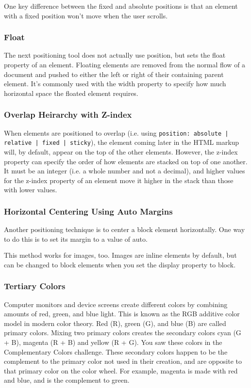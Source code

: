One key difference between the fixed and absolute positions is that an element with a fixed position won't move when the user scrolls.

\subsubsection{Float}
The next positioning tool does not actually use position, but sets the float property of an element. Floating elements are removed from the normal flow of a document and pushed to either the left or right of their containing parent element. It's commonly used with the width property to specify how much horizontal space the floated element requires.

\subsubsection{Overlap Heirarchy with Z-index}
When elements are positioned to overlap (i.e. using \texttt{position: absolute | relative | fixed | sticky}), the element coming later in the HTML markup will, by default, appear on the top of the other elements. However, the z-index property can specify the order of how elements are stacked on top of one another. It must be an integer (i.e. a whole number and not a decimal), and higher values for the z-index property of an element move it higher in the stack than those with lower values.


\subsubsection{Horizontal Centering Using Auto Margins}


Another positioning technique is to center a block element horizontally. One way to do this is to set its margin to a value of auto.

This method works for images, too. Images are inline elements by default, but can be changed to block elements when you set the display property to block.


\subsubsection{Tertiary Colors}
Computer monitors and device screens create different colors by combining amounts of red, green, and blue light. This is known as the RGB additive color model in modern color theory. Red (R), green (G), and blue (B) are called primary colors. Mixing two primary colors creates the secondary colors cyan (G + B), magenta (R + B) and yellow (R + G). You saw these colors in the Complementary Colors challenge. These secondary colors happen to be the complement to the primary color not used in their creation, and are opposite to that primary color on the color wheel. For example, magenta is made with red and blue, and is the complement to green.

